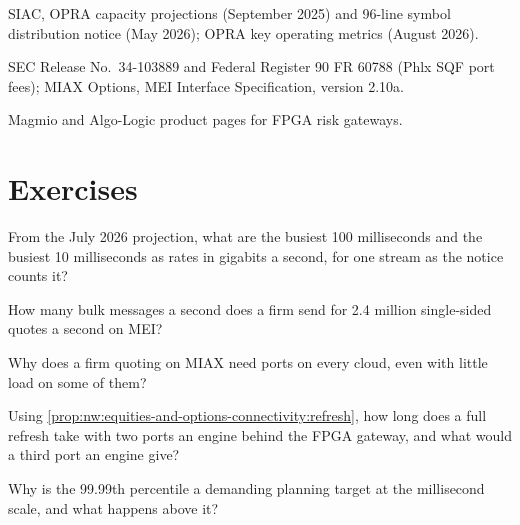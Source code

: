 \begin{omsources}
\item SIAC, OPRA capacity projections (September 2025) and 96-line symbol distribution notice (May 2026); OPRA key operating
  metrics (August 2026).
\item SEC Release No.~34-103889 and Federal Register 90 FR 60788 (Phlx SQF port fees); MIAX Options, MEI Interface
  Specification, version 2.10a.
\item Magmio and Algo-Logic product pages for FPGA risk gateways.
\end{omsources}

\section{Exercises}

\begin{exercise}[$\star$]\label{exo:nw:equities-and-options-connectivity:1}
From the July 2026 projection, what are the busiest 100 milliseconds and the busiest 10 milliseconds as rates in gigabits a
second, for one stream as the notice counts it?
\end{exercise}

\begin{exercise}[$\star$]\label{exo:nw:equities-and-options-connectivity:2}
How many bulk messages a second does a firm send for 2.4 million single-sided quotes a second on MEI?
\end{exercise}

\begin{exercise}[$\star$]\label{exo:nw:equities-and-options-connectivity:3}
Why does a firm quoting on MIAX need ports on every cloud, even with little load on some of them?
\end{exercise}

\begin{exercise}[$\star\star$]\label{exo:nw:equities-and-options-connectivity:4}
Using \cref{prop:nw:equities-and-options-connectivity:refresh}, how long does a full refresh take with two ports an engine behind the
FPGA gateway, and what would a third port an engine give?
\end{exercise}

\begin{exercise}[$\star\star$]\label{exo:nw:equities-and-options-connectivity:5}
Why is the 99.99th percentile a demanding planning target at the millisecond scale, and what happens above it?
\end{exercise}


